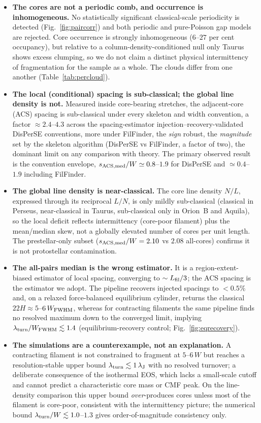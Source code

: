 \documentclass[usenatbib,twoside,twocolumn]{mnras}
\begin{document}
\begin{itemize}
    \item \textbf{The cores are not a periodic comb, and occurrence is inhomogeneous.} No statistically significant classical-scale periodicity is detected (Fig.~\ref{fig:paircorr}) and both periodic and pure-Poisson gap models are rejected. Core occurrence is strongly inhomogeneous ($6$--$27$ per cent occupancy), but relative to a column-density-conditioned null only Taurus shows excess clumping, so we do not claim a distinct physical intermittency of fragmentation for the sample as a whole. The clouds differ from one another (Table~\ref{tab:percloud}).
    \item \textbf{The local (conditional) spacing is sub-classical; the global line density is not.} Measured inside core-bearing stretches, the adjacent-core (ACS) spacing is sub-classical under every skeleton and width convention, a factor $\approx2.4$--$4.3$ across the spacing-estimator injection--recovery-validated DisPerSE conventions, more under FilFinder, the \emph{sign} robust, the \emph{magnitude} set by the skeleton algorithm (DisPerSE vs FilFinder, a factor of two), the dominant limit on any comparison with theory. The primary observed result is the convention envelope, $s_{\rm ACS,med}/W\simeq0.8$--$1.9$ for DisPerSE and $\simeq0.4$--$1.9$ including FilFinder.
    \item \textbf{The global line density is near-classical.} The core line density $N/L$, expressed through its reciprocal $L/N$, is only mildly sub-classical (classical in Perseus, near-classical in Taurus, sub-classical only in Orion~B and Aquila), so the local deficit reflects intermittency (core-poor filament) plus the mean/median skew, not a globally elevated number of cores per unit length. The prestellar-only subset ($s_{\rm ACS,med}/W=2.10$ vs $2.08$ all-cores) confirms it is not protostellar contamination.
    \item \textbf{The all-pairs median is the wrong estimator.} It is a region-extent-biased estimator of local spacing, converging to $\sim L_{\rm fil}/3$; the ACS spacing is the estimator we adopt. The pipeline recovers injected spacings to $<0.5\%$ and, on a relaxed force-balanced equilibrium cylinder, returns the classical $22H\approx5$--$6\,W_{\rm FWHM}$, whereas for contracting filaments the same pipeline finds no resolved maximum down to the converged limit, implying $\lambda_{\rm turn}/W_{\rm FWHM}\lesssim1.4$ (equilibrium-recovery control; Fig.~\ref{fig:eqrecovery}).
    \item \textbf{The simulations are a counterexample, not an explanation.} A contracting filament is not constrained to fragment at $5$--$6\,W$ but reaches a resolution-stable upper bound $\lambda_{\rm turn}\lesssim1\,\lambda_{\rm J}$ with no resolved turnover; a deliberate consequence of the isothermal EOS, which lacks a small-scale cutoff and cannot predict a characteristic core mass or CMF peak. On the line-density comparison this upper bound \emph{over}-produces cores unless most of the filament is core-poor, consistent with the intermittency picture; the numerical bound $\lambda_{\rm turn}/W\lesssim1.0$--$1.3$ gives order-of-magnitude consistency only.

\end{itemize}
\end{document}
